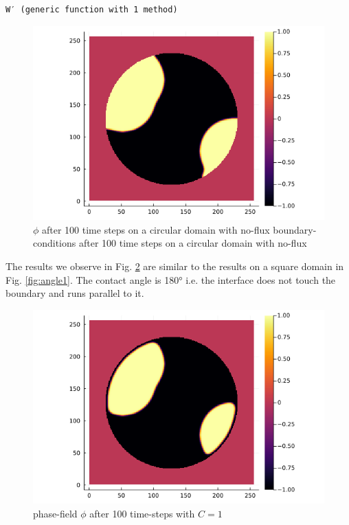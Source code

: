 \documentclass{mimosis}
\begin{document}
\label{}
\begin{verbatim}
W′ (generic function with 1 method)
\end{verbatim}



\begin{figure}[htbp]
\centering
\includegraphics[width=.9\linewidth]{images/angle0c.png}
\caption{\label{fig:angle0c}\(\phi\) after 100 time steps on a circular domain with no-flux boundary-conditions after 100 time steps on a circular domain with no-flux}
\end{figure}



The results we observe in Fig. \ref{fig:angle1c} are similar to the results on a square domain in Fig. \ref{fig:angle1}. The contact angle is 180° i.e. the interface does not touch the boundary and runs parallel to it.
\begin{figure}[htbp]
\centering
\includegraphics[width=.9\linewidth]{images/anfle1c.png}
\caption{\label{fig:angle1c}phase-field \(\phi\) after 100 time-steps with \(C=1\)}
\end{figure}
\end{document}
